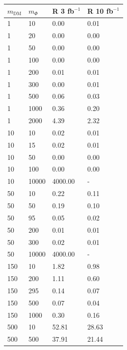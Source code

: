 \begin{table}[h!]
\centering
\begin{tabular}{llll}
\hline                      
 $m_\textrm{DM}$ & $m_\Phi$  & R 3 fb$^{-1}$ & R 10 fb$^{-1}$ \\ \hline


1  &       10  &      0.00  &    0.01 \\\hline
1  &       20  &      0.00  &    0.00 \\\hline
1  &       50  &      0.00  &    0.00 \\\hline
1  &       100  &     0.00  &    0.00 \\\hline
1  &       200  &     0.01  &    0.01 \\\hline
1  &       300  &     0.00  &    0.01 \\\hline
1  &       500  &     0.06  &    0.03 \\\hline
1  &       1000  &    0.36  &    0.20 \\\hline
1  &       2000  &    4.39  &    2.32 \\\hline
10  &      10  &      0.02  &    0.01 \\\hline
10  &      15  &      0.02  &    0.01 \\\hline
10  &      50  &      0.00  &    0.00 \\\hline
10  &      100  &     0.00  &    0.00 \\\hline
10  &    10000  &  4000.00 & - \\\hline
50  &      10  &      0.22  &    0.11 \\\hline
50  &      50  &      0.19  &    0.10 \\\hline
50  &      95  &      0.05  &    0.02 \\\hline
50  &      200  &     0.01  &    0.01 \\\hline
50  &      300  &     0.02  &    0.01 \\\hline
50  &    10000  &  4000.00  &   - \\ \hline
150  &     10  &      1.82  &    0.98 \\\hline
150  &     200  &     1.11  &    0.60 \\\hline
150  &     295  &     0.14  &    0.07 \\\hline
150  &     500  &     0.07  &    0.04 \\\hline
150  &     1000  &    0.30  &    0.16 \\\hline
500  &     10  &      52.81  &   28.63 \\\hline
500  &     500  &     37.91  &   21.44 \\\hline

\end{tabular}
\end{table}
